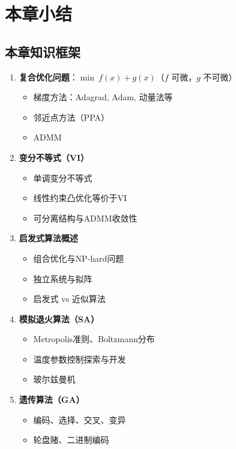 \section{本章小结}\label{sec:ch8-summary}

\subsection{本章知识框架}

\begin{conceptbox}
\begin{enumerate}[label=\arabic*., leftmargin=2em]
    \item \textbf{复合优化问题}：$\min\ f(x) + g(x)$（$f$ 可微，$g$ 不可微）
    \begin{itemize}
        \item 梯度方法：Adagrad, Adam, 动量法等
        \item 邻近点方法（PPA）
        \item ADMM
    \end{itemize}
    \item \textbf{变分不等式（VI）}
    \begin{itemize}
        \item 单调变分不等式
        \item 线性约束凸优化等价于VI
        \item 可分离结构与ADMM收敛性
    \end{itemize}
    \item \textbf{启发式算法概述}
    \begin{itemize}
        \item 组合优化与NP-hard问题
        \item 独立系统与拟阵
        \item 启发式 vs 近似算法
    \end{itemize}
    \item \textbf{模拟退火算法（SA）}
    \begin{itemize}
        \item Metropolis准则、Boltzmann分布
        \item 温度参数控制探索与开发
        \item 玻尔兹曼机
    \end{itemize}
    \item \textbf{遗传算法（GA）}
    \begin{itemize}
        \item 编码、选择、交叉、变异
        \item 轮盘赌、二进制编码

\end{itemize}
\end{enumerate}
\end{conceptbox}
